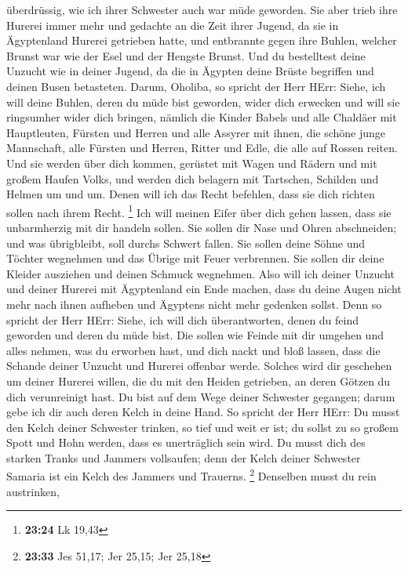 überdrüssig, wie ich ihrer Schwester auch war müde geworden.
 Sie aber trieb ihre Hurerei immer mehr und gedachte an
die Zeit ihrer Jugend, da sie in Ägyptenland Hurerei getrieben hatte,
 und entbrannte gegen ihre Buhlen, welcher Brunst war wie
der Esel und der Hengste Brunst.  Und du bestelltest
deine Unzucht wie in deiner Jugend, da die in Ägypten deine Brüste
begriffen und deinen Busen betasteten.  Darum, Oholiba,
so spricht der Herr HErr: Siehe, ich will deine Buhlen, deren du müde
bist geworden, wider dich erwecken und will sie ringsumher wider dich
bringen,  nämlich die Kinder Babels und alle Chaldäer mit
Hauptleuten, Fürsten und Herren und alle Assyrer mit ihnen, die schöne
junge Mannschaft, alle Fürsten und Herren, Ritter und Edle, die alle auf
Rossen reiten.  Und sie werden über dich kommen, gerüstet
mit Wagen und Rädern und mit großem Haufen Volks, und werden dich
belagern mit Tartschen, Schilden und Helmen um und um. Denen will ich
das Recht befehlen, dass sie dich richten sollen nach ihrem Recht.
\footnote{\textbf{23:24} Lk 19,43}  Ich will meinen Eifer
über dich gehen lassen, dass sie unbarmherzig mit dir handeln sollen.
Sie sollen dir Nase und Ohren abschneiden; und was übrigbleibt, soll
durchs Schwert fallen. Sie sollen deine Söhne und Töchter wegnehmen und
das Übrige mit Feuer verbrennen.  Sie sollen dir deine
Kleider ausziehen und deinen Schmuck wegnehmen.  Also
will ich deiner Unzucht und deiner Hurerei mit Ägyptenland ein Ende
machen, dass du deine Augen nicht mehr nach ihnen aufheben und Ägyptens
nicht mehr gedenken sollst.  Denn so spricht der Herr
HErr: Siehe, ich will dich überantworten, denen du feind geworden und
deren du müde bist.  Die sollen wie Feinde mit dir
umgehen und alles nehmen, was du erworben hast, und dich nackt und bloß
lassen, dass die Schande deiner Unzucht und Hurerei offenbar werde.
 Solches wird dir geschehen um deiner Hurerei willen, die
du mit den Heiden getrieben, an deren Götzen du dich verunreinigt hast.
 Du bist auf dem Wege deiner Schwester gegangen; darum
gebe ich dir auch deren Kelch in deine Hand.  So spricht
der Herr HErr: Du musst den Kelch deiner Schwester trinken, so tief und
weit er ist; du sollst zu so großem Spott und Hohn werden, dass es
unerträglich sein wird.  Du musst dich des starken Tranks
und Jammers vollsaufen; denn der Kelch deiner Schwester Samaria ist ein
Kelch des Jammers und Trauerns. \footnote{\textbf{23:33} Jes 51,17; Jer
  25,15; Jer 25,18}  Denselben musst du rein austrinken,
